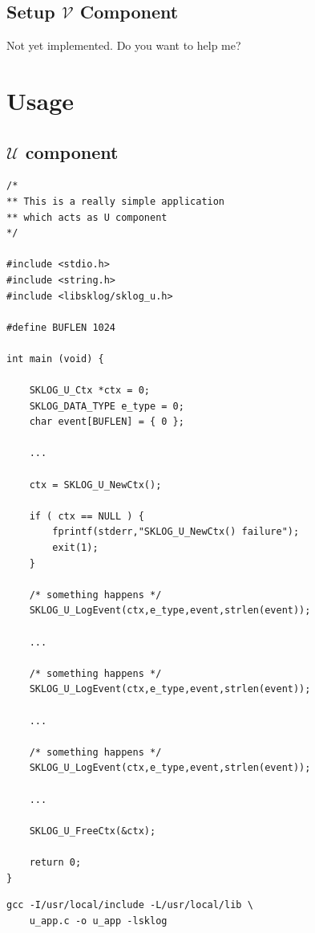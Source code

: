 \documentclass[a4paper,12pt]{article}
\def\u{$\mathcal{U}$\xspace}
\begin{document}

\subsection{Setup $\mathcal{V}$ Component}

Not yet implemented. Do you want to help me?

\newpage
\section{Usage}

\subsection{\u component}

\begin{lstlisting}
/*
** This is a really simple application
** which acts as U component
*/

#include <stdio.h>
#include <string.h>
#include <libsklog/sklog_u.h>

#define BUFLEN 1024

int main (void) {

    SKLOG_U_Ctx *ctx = 0;
    SKLOG_DATA_TYPE e_type = 0;
    char event[BUFLEN] = { 0 };

    ...

    ctx = SKLOG_U_NewCtx();

    if ( ctx == NULL ) {
        fprintf(stderr,"SKLOG_U_NewCtx() failure");
        exit(1);
    }

    /* something happens */
    SKLOG_U_LogEvent(ctx,e_type,event,strlen(event));

    ...

    /* something happens */
    SKLOG_U_LogEvent(ctx,e_type,event,strlen(event));

    ...

    /* something happens */
    SKLOG_U_LogEvent(ctx,e_type,event,strlen(event));

    ...

    SKLOG_U_FreeCtx(&ctx);

    return 0;
} 
\end{lstlisting}

\begin{lstlisting}
gcc -I/usr/local/include -L/usr/local/lib \
    u_app.c -o u_app -lsklog
\end{lstlisting}
\newpage
\end{document}
